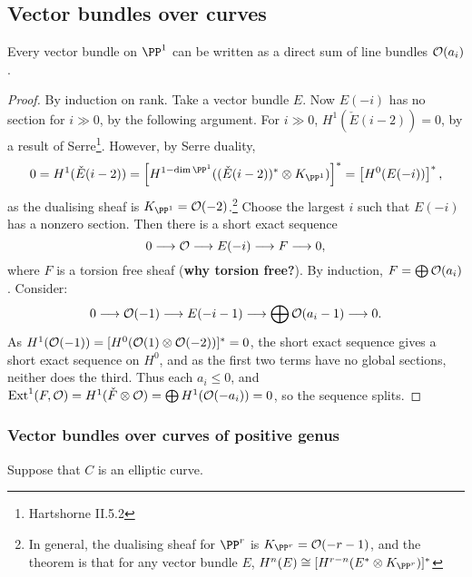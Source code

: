 \documentclass[11pt]{article}
\begin{document}
\subsection*{Vector bundles over curves}
\begin{thm*}
Every vector bundle on $\PP^1$ can be written as a direct sum of line bundles
$\mathcal{O}(a_i)$.
\end{thm*}
\begin{proof}
By induction on rank. Take a vector bundle $E$. Now $E(-i)$ has no section for
$i\gg0$, by the following argument. For $i\gg0$, $H^1(\check E(i-2))=0$, by a
result of Serre\footnote{Hartshorne II.5.2}. However, by Serre duality,
\[0=H^1(\check E(i-2))=\left[H^{1-\dim\PP^1}(({\check E(i-2)})^*\otimes
K_{\PP^1})\right]^*=\left[H^0(E(-i))\right]^*,\]
as the dualising sheaf is $K_{\PP^1}=\calO(-2)$.\footnote{In general, the
dualising sheaf for $\PP^r$ is $K_{\PP^r}=\calO(-r-1)$, and the theorem is that
for any vector bundle $E$, $H^n(E)\cong [H^{r-n}(E^*\otimes K_{\PP^r})]^*$}
Choose the largest $i$ such that $E(-i)$ has a nonzero section. Then there is a
short exact sequence
\[0\longrightarrow\mathcal{O}\longrightarrow E(-i)\longrightarrow F\longrightarrow 0,\]
where $F$ is a torsion free sheaf (\textbf{why torsion free?}). By induction,
$F=\bigoplus \mathcal{O}(a_i)$. Consider:
\[0\longrightarrow\mathcal{O}(-1)\longrightarrow E(-i-1)\longrightarrow\bigoplus\mathcal{O}(a_i-1)\longrightarrow 0.\]
As $H^1(\mathcal{O}(-1))=[H^0(\mathcal{O}(1)\otimes\mathcal{O}(-2))]^*=0$, the short exact
sequence gives a short exact sequence on $H^0$, and as the first two terms have
no global sections, neither does the third. Thus each $a_i\leq0$, and
$\operatorname{Ext}^1(F,\mathcal{O})=H^1(\check F\otimes\mathcal{O})=\bigoplus H^1(\mathcal{O}(-a_i))=0$, so the
sequence splits.
\end{proof}
\subsubsection*{Vector bundles over curves of positive genus}
Suppose that $C$ is an elliptic curve.
\end{document}
